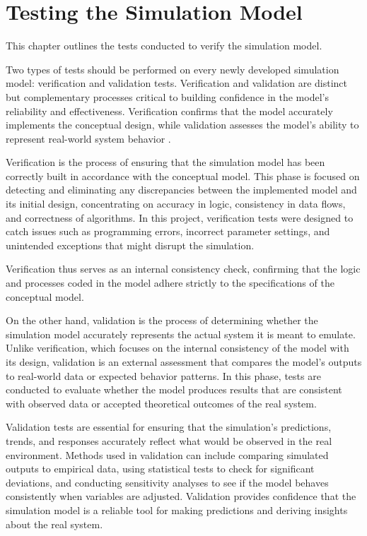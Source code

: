 \chapter{Testing the Simulation Model}\label{ch:testing}

This chapter outlines the tests conducted to verify the simulation model.

Two types of tests should be performed on every newly developed simulation
model: verification and validation tests. Verification and validation are
distinct but complementary processes critical to building confidence in the
model's reliability and effectiveness. Verification confirms that the model
accurately implements the conceptual design, while validation assesses the
model's ability to represent real-world system behavior
\cite[Chapter~15]{omnetpp-simulation-manual}.

Verification is the process of ensuring that the simulation model has been
correctly built in accordance with the conceptual model. This phase is focused
on detecting and eliminating any discrepancies between the implemented model
and its initial design, concentrating on accuracy in logic, consistency in data
flows, and correctness of algorithms. In this project, verification tests were
designed to catch issues such as programming errors, incorrect parameter
settings, and unintended exceptions that might disrupt the simulation.

Verification thus serves as an internal consistency check, confirming that the
logic and processes coded in the model adhere strictly to the specifications of
the conceptual model.

On the other hand, validation is the process of determining whether the
simulation model accurately represents the actual system it is meant to
emulate. Unlike verification, which focuses on the internal consistency of the
model with its design, validation is an external assessment that compares the
model's outputs to real-world data or expected behavior patterns. In this
phase, tests are conducted to evaluate whether the model produces results that
are consistent with observed data or accepted theoretical outcomes of the real
system.

Validation tests are essential for ensuring that the simulation's predictions,
trends, and responses accurately reflect what would be observed in the real
environment. Methods used in validation can include comparing simulated outputs
to empirical data, using statistical tests to check for significant deviations,
and conducting sensitivity analyses to see if the model behaves consistently
when variables are adjusted. Validation provides confidence that the simulation
model is a reliable tool for making predictions and deriving insights about the
real system.

